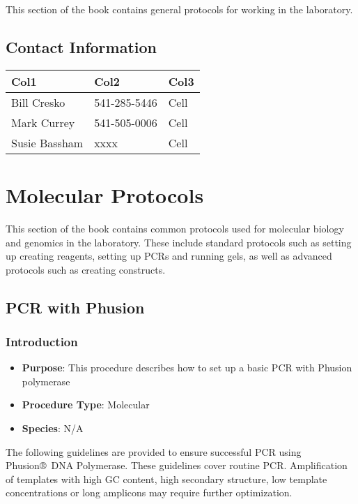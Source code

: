 \documentclass[
  letterpaper,
  DIV=11,
  numbers=noendperiod]{scrreprt}
\providecommand{\tightlist}{%
  \setlength{\itemsep}{0pt}\setlength{\parskip}{0pt}}\usepackage{longtable,booktabs,array}
\begin{document}
This section of the book contains general protocols for working in the
laboratory.

\hypertarget{sec-general-contact}{%
\chapter{Contact Information}\label{sec-general-contact}}

\begin{longtable}[]{@{}lll@{}}
\toprule\noalign{}
Col1 & Col2 & Col3 \\
\midrule\noalign{}
\endhead
\bottomrule\noalign{}
\endlastfoot
Bill Cresko & 541-285-5446 & Cell \\
Mark Currey & 541-505-0006 & Cell \\
Susie Bassham & xxxx & Cell \\
\end{longtable}

\part{Molecular Protocols}

This section of the book contains common protocols used for molecular
biology and genomics in the laboratory. These include standard protocols
such as setting up creating reagents, setting up PCRs and running gels,
as well as advanced protocols such as creating constructs.

\hypertarget{sec-molec-Phusion_PCR}{%
\chapter{PCR with Phusion}\label{sec-molec-Phusion_PCR}}

\hypertarget{introduction}{%
\section{Introduction}\label{introduction}}

\begin{itemize}
\tightlist
\item
  \textbf{Purpose}: This procedure describes how to set up a basic PCR
  with Phusion polymerase
\item
  \textbf{Procedure Type}: Molecular
\item
  \textbf{Species}: N/A
\end{itemize}

The following guidelines are provided to ensure successful PCR using
Phusion®~DNA Polymerase. These guidelines cover routine PCR.
Amplification of templates with high GC content, high secondary
structure, low template concentrations or long amplicons may require
further optimization.
\end{document}
